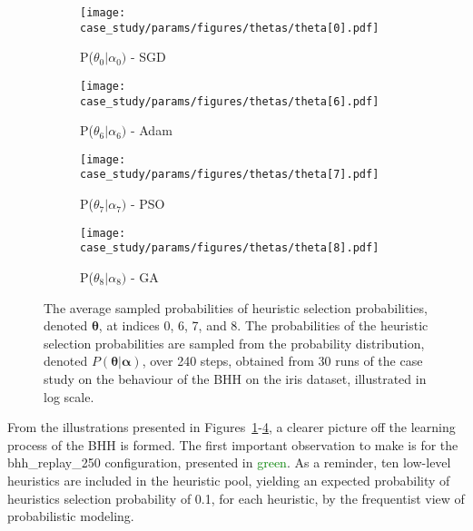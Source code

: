 \begin{figure}[htb]
      \begin{subfigure}{0.5\textwidth}
            \centering
            \texttt{[image: case\_study/params/figures/thetas/theta[0].pdf]}
            \caption{P($\theta_{0} \vert \alpha_{0})$ - \acs{SGD}}
            \label{fig:results:case_study:thetas:0}
      \end{subfigure}
      \begin{subfigure}{0.5\textwidth}
            \centering
            \texttt{[image: case\_study/params/figures/thetas/theta[6].pdf]}
            \caption{P($\theta_{6} \vert \alpha_{6})$ - \acs{Adam}}
            \label{fig:results:case_study:thetas:6}
      \end{subfigure}
      \par\bigskip
      \begin{subfigure}{0.5\textwidth}
            \centering
            \texttt{[image: case\_study/params/figures/thetas/theta[7].pdf]}
            \caption{P($\theta_{7} \vert \alpha_{7})$ - \acs{PSO}}
            \label{fig:results:case_study:thetas:7}
      \end{subfigure}
      \begin{subfigure}{0.5\textwidth}
            \centering
            \texttt{[image: case\_study/params/figures/thetas/theta[8].pdf]}
            \caption{P($\theta_{8} \vert \alpha_{8})$ - \acs{GA}}
            \label{fig:results:case_study:thetas:8}
      \end{subfigure}
      \par\bigskip
      \caption{The average sampled probabilities of heuristic selection probabilities, denoted $\boldsymbol{\theta}$, at indices 0, 6, 7, and 8. The probabilities of the heuristic selection probabilities are sampled from the probability distribution, denoted $P(\boldsymbol{\theta} \vert \boldsymbol{\alpha})$, over 240 steps, obtained from 30 runs of the case study on the behaviour of the \acs{BHH} on the iris dataset, illustrated in log scale.}
      \label{fig:results:case_study:thetas}
\end{figure}


From the illustrations presented in Figures~\ref{fig:results:case_study:thetas:0}-\ref{fig:results:case_study:thetas:8}, a clearer picture off the learning process of the \acs{BHH} is formed. The first important observation to make is for the bhh\_replay\_250 configuration, presented in \textcolor{green}{green}. As a reminder, ten low-level heuristics are included in the heuristic pool, yielding an expected probability of heuristics selection probability of 0.1, for each heuristic, by the frequentist view of probabilistic modeling.


